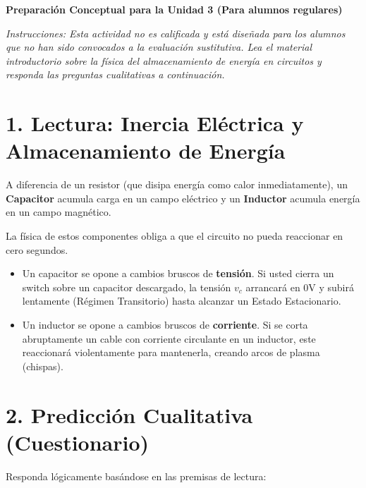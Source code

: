 \documentclass[11pt, a4paper]{article}
\begin{document}
\begin{tcolorbox}[colback=ucbblue!5!white, colframe=ucbblue, title=\textbf{Actividad Autónoma Formativa: Puente a Transitorios (EC3)}]
    \centering \textbf{Preparación Conceptual para la Unidad 3 (Para alumnos regulares)}
\end{tcolorbox}

\noindent\textit{Instrucciones: Esta actividad no es calificada y está diseñada para los alumnos que no han sido convocados a la evaluación sustitutiva. Lea el material introductorio sobre la física del almacenamiento de energía en circuitos y responda las preguntas cualitativas a continuación.}

\section*{1. Lectura: Inercia Eléctrica y Almacenamiento de Energía}
A diferencia de un resistor (que disipa energía como calor inmediatamente), un \textbf{Capacitor} acumula carga en un campo eléctrico y un \textbf{Inductor} acumula energía en un campo magnético. 

La física de estos componentes obliga a que el circuito no pueda reaccionar en cero segundos. 
\begin{itemize}
    \item Un capacitor se opone a cambios bruscos de \textbf{tensión}. Si usted cierra un switch sobre un capacitor descargado, la tensión $v_c$ arrancará en 0V y subirá lentamente (Régimen Transitorio) hasta alcanzar un Estado Estacionario.
    \item Un inductor se opone a cambios bruscos de \textbf{corriente}. Si se corta abruptamente un cable con corriente circulante en un inductor, este reaccionará violentamente para mantenerla, creando arcos de plasma (chispas).
\end{itemize}

\section*{2. Predicción Cualitativa (Cuestionario)}
Responda lógicamente basándose en las premisas de lectura:
\end{document}
